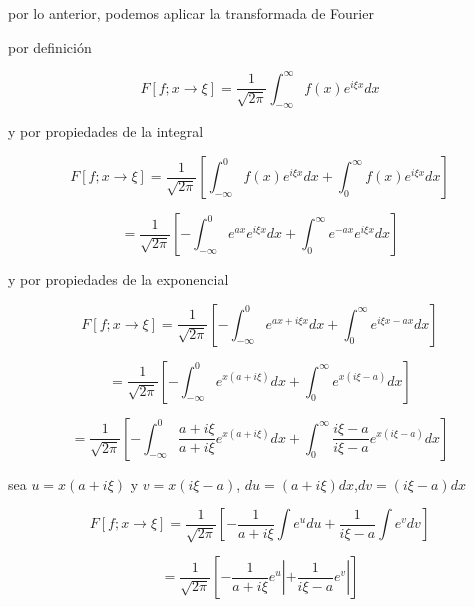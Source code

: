 \documentclass[12pt,a4paper]{article}
\begin{document}
\begin{enumerate}
    por lo anterior, podemos aplicar la transformada de Fourier
    
    por definición
    
    \begin{equation*}
        F[f;x \rightarrow \xi] = \frac{1}{ \sqrt{2\pi}} \int_{-\infty}^{\infty} f(x)e^{i\xi x} dx
    \end{equation*}
    
    y por propiedades de la integral
    
    \begin{equation*}
        F[f;x \rightarrow \xi] = \frac{1}{ \sqrt{2\pi}} \left[\int_{-\infty}^{0} f(x)e^{i\xi x} dx + \int_{0}^{\infty} f(x)e^{i\xi x} dx \right]
    \end{equation*}
    
    \begin{equation*}
        = \frac{1}{ \sqrt{2\pi}} \left[-\int_{-\infty}^{0}e^{ax} e^{i\xi x} dx + \int_{0}^{\infty} e^{-ax}e^{i\xi x} dx \right]
    \end{equation*}
    
    y por propiedades de la exponencial
    
    \begin{equation*}
         F[f;x \rightarrow \xi] = \frac{1}{ \sqrt{2\pi}} \left[-\int_{-\infty}^{0} e^{ax+i\xi x} dx + \int_{0}^{\infty}e^{i\xi x-ax} dx \right]
    \end{equation*}
    
    \begin{equation*}
        = \frac{1}{ \sqrt{2\pi}} \left[-\int_{-\infty}^{0} e^{x(a+i\xi)} dx + \int_{0}^{\infty}e^{x(i\xi -a)} dx \right]
    \end{equation*}
    
    \begin{equation*}
        = \frac{1}{ \sqrt{2\pi}} \left[-\int_{-\infty}^{0}\frac{a+i\xi}{a+i\xi} e^{x(a+i\xi)} dx + \int_{0}^{\infty}\frac{i\xi -a}{i\xi -a}e^{x(i\xi -a)} dx \right]
    \end{equation*}
    
    sea $u=x(a+i\xi)$ y $v=x(i\xi -a)$, $du=(a+i\xi)dx$,$dv=(i\xi -a)dx$
    
    \begin{equation*}
         F[f;x \rightarrow \xi] =  \frac{1}{ \sqrt{2\pi}} \left[-\frac{1}{a+i\xi}\int e^{u} du + \frac{1}{i\xi -a}\int e^{v} dv \right]
    \end{equation*}
    
    \begin{equation*}
        =  \frac{1}{ \sqrt{2\pi}} \left[-\frac{1}{a+i\xi} e^{u}| + \frac{1}{i\xi -a} e^v | \right]
    \end{equation*}
    

\end{enumerate}
\end{document}
